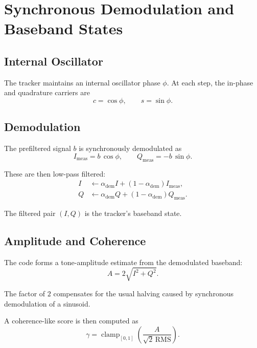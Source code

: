 \documentclass[conference]{IEEEtran}
\begin{document}
\section{Synchronous Demodulation and Baseband States}

\subsection{Internal Oscillator}

The tracker maintains an internal oscillator phase \(\phi\). At each step,
the in-phase and quadrature carriers are
\begin{equation}
  c = \cos\phi,
  \qquad
  s = \sin\phi.
\end{equation}

\subsection{Demodulation}

The prefiltered signal \(b\) is synchronously demodulated as
\begin{equation}
  I_{\mathrm{meas}} = b\,\cos\phi,
  \qquad
  Q_{\mathrm{meas}} = -b\,\sin\phi.
\end{equation}

These are then low-pass filtered:
\begin{align}
  I &\leftarrow \alpha_{\mathrm{dem}} I + (1-\alpha_{\mathrm{dem}})I_{\mathrm{meas}},\\
  Q &\leftarrow \alpha_{\mathrm{dem}} Q + (1-\alpha_{\mathrm{dem}})Q_{\mathrm{meas}}.
\end{align}

The filtered pair \((I,Q)\) is the tracker’s baseband state.

\subsection{Amplitude and Coherence}

The code forms a tone-amplitude estimate from the demodulated baseband:
\begin{equation}
  A = 2\sqrt{I^2 + Q^2}.
\end{equation}

The factor of \(2\) compensates for the usual halving caused by synchronous
demodulation of a sinusoid.

A coherence-like score is then computed as
\begin{equation}
  \gamma
  =
  \operatorname{clamp}_{[0,1]}
  \left(
    \frac{A}{\sqrt{2}\,\mathrm{RMS}}
  \right).
\end{equation}
\end{document}
